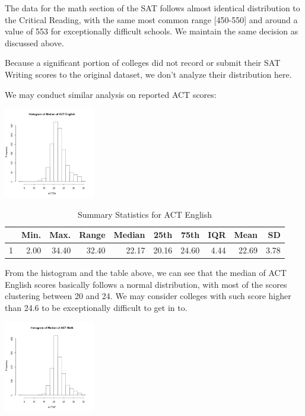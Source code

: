 \documentclass{article}\usepackage[]{graphicx}\usepackage[]{color}
\begin{document}
The data for the math section of the SAT follows almost identical distribution to the Critical Reading, with the same most common range [450-550] and around a value of 553 for exceptionally difficult schools. We maintain the same decision as discussed above.\newline

Because a significant portion of colleges did not record or submit their SAT Writing scores to the original dataset, we don't analyze their distribution here.\newline

We may conduct similar analysis on reported ACT scores:



{\centering \includegraphics[width=150px]{../images/histogram-ACTENMedian} 

}


\begin{table}[ht]
\centering
\begin{tabular}{rrrrrrrrrr}
  \hline
 & Min. & Max. & Range & Median & 25th & 75th & IQR & Mean & SD \\ 
  \hline
1 & 2.00 & 34.40 & 32.40 & 22.17 & 20.16 & 24.60 & 4.44 & 22.69 & 3.78 \\ 
   \hline
\end{tabular}
\caption{Summary Statistics for ACT English} 
\end{table}


From the histogram and the table above, we can see that the median of ACT English scores basically follows a normal distribution, with most of the scores clustering between 20 and 24. We may consider colleges with such score higher than 24.6 to be exceptionally difficult to get in to.



{\centering \includegraphics[width=150px]{../images/histogram-ACTMTMedian} 

}
\end{document}
